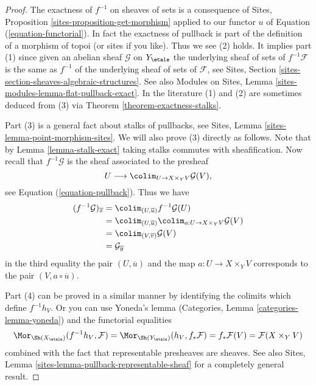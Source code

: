 \begin{proof}
The exactness of $f^{-1}$ on sheaves of sets is a consequence of
Sites, Proposition \ref{sites-proposition-get-morphism}
applied to our functor $u$ of Equation (\ref{equation-functorial}).
In fact the exactness of pullback is part of the definition of
a morphism of topoi (or sites if you like). Thus we see (2) holds.
It implies part (1) since given an abelian sheaf $\mathcal{G}$ on
$Y_\etale$
the underlying sheaf of sets of $f^{-1}\mathcal{F}$ is the same
as $f^{-1}$ of the underlying sheaf of sets of $\mathcal{F}$, see
Sites, Section \ref{sites-section-sheaves-algebraic-structures}.
See also
Modules on Sites, Lemma \ref{sites-modules-lemma-flat-pullback-exact}.
In the literature (1) and (2) are sometimes deduced from (3) via
Theorem \ref{theorem-exactness-stalks}.

\medskip\noindent
Part (3) is a general fact about stalks of pullbacks, see
Sites, Lemma \ref{sites-lemma-point-morphism-sites}.
We will also prove (3) directly as follows. Note that by
Lemma \ref{lemma-stalk-exact}
taking stalks commutes with sheafification.
Now recall that $f^{-1}\mathcal{G}$ is the sheaf
associated to the presheaf
$$
U \longrightarrow \colim_{U \to X \times_Y V} \mathcal{G}(V),
$$
see Equation (\ref{equation-pullback}).
Thus we have
\begin{align*}
(f^{-1}\mathcal{G})_{\overline{x}}
& = \colim_{(U, \overline{u})} f^{-1}\mathcal{G}(U) \\
& = \colim_{(U, \overline{u})}
\colim_{a : U \to X \times_Y V} \mathcal{G}(V) \\
& = \colim_{(V, \overline{v})} \mathcal{G}(V) \\
& = \mathcal{G}_{\overline{y}}
\end{align*}
in the third equality the pair $(U, \overline{u})$ and the map
$a : U \to X \times_Y V$ corresponds to the pair $(V, a \circ \overline{u})$.

\medskip\noindent
Part (4) can be proved in a similar manner by identifying the colimits
which define $f^{-1}h_V$. Or you can use
Yoneda's lemma (Categories, Lemma \ref{categories-lemma-yoneda})
and the functorial equalities
$$
\Mor_{\Sh(X_\etale)}(f^{-1}h_V, \mathcal{F}) =
\Mor_{\Sh(Y_\etale)}(h_V, f_*\mathcal{F}) =
f_*\mathcal{F}(V) = \mathcal{F}(X \times_Y V)
$$
combined with the fact that representable presheaves are sheaves. See also
Sites, Lemma \ref{sites-lemma-pullback-representable-sheaf}
for a completely general result.
\end{proof}

